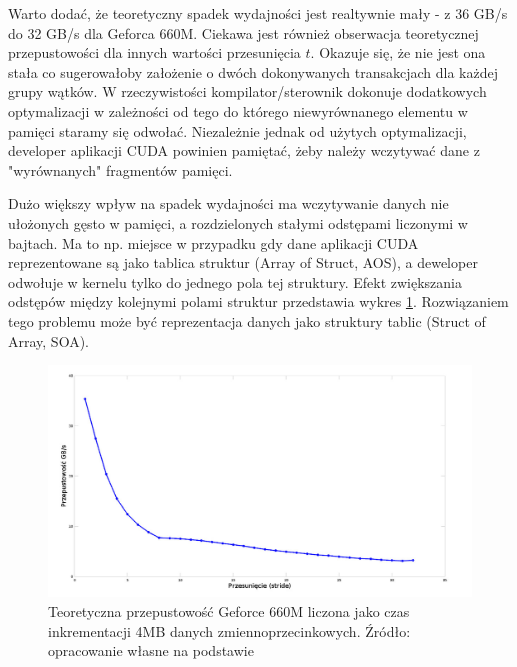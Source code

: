 Warto dodać, że teoretyczny spadek wydajności jest realtywnie
mały - z 36 GB/s do 32 GB/s dla Geforca 660M. Ciekawa jest również obserwacja
teoretycznej przepustowości dla innych wartości przesunięcia $t$. Okazuje się,
			 że nie jest ona stała co sugerowałoby założenie o dwóch dokonywanych
			 transakcjach dla każdej grupy wątków. W rzeczywistości
			 kompilator/sterownik dokonuje dodatkowych optymalizacji w
			 zależności od tego do którego niewyrównanego elementu w pamięci staramy się
			 odwołać. Niezależnie jednak od użytych optymalizacji, developer aplikacji CUDA
			 powinien pamiętać, żeby należy wczytywać dane z "wyrównanych"
			 fragmentów pamięci.

Dużo większy wpływ na spadek wydajności ma wczytywanie danych nie ułożonych gęsto w
pamięci, a rozdzielonych stałymi odstępami liczonymi w bajtach. Ma to np. miejsce w przypadku gdy
dane aplikacji CUDA reprezentowane są jako tablica struktur (Array of Struct, AOS), a deweloper
odwołuje w kernelu tylko do jednego pola tej struktury. Efekt zwiększania odstępów
między kolejnymi polami struktur przedstawia wykres \ref{hier}. Rozwiązaniem tego
problemu może być reprezentacja danych jako struktury tablic (Struct of Array,
		SOA).

\begin{figure}[H]
\centering
\includegraphics[scale=0.4]{images/gf660_stride.png}
\caption{Teoretyczna przepustowość Geforce 660M liczona jako czas inkrementacji
	4MB danych zmiennoprzecinkowych. Źródło: opracowanie własne na
	podstawie \cite{memperf}}
\label{hier}
\end{figure}
